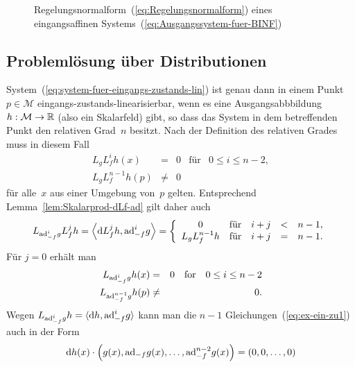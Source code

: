 \begin{figure}
\begin{centering}
\resizebox{0.9\textwidth}{!}{}
\par\end{centering}
\caption{Regelungsnormalform~(\ref{eq:Regelungsnormalform}) eines eingangsaffinen
Systems~(\ref{eq:Ausgangssystem-fuer-BINF})\label{fig:regelungsnormalform}}
\end{figure}


\subsection{Problemlösung über Distributionen\label{subsec:EZ-Linearisierung-Distributionen}}

System~(\ref{eq:system-fuer-eingangs-zustands-lin}) ist genau dann
in einem Punkt $p\in\mathcal{M}$ eingangs-zustands-linearisierbar,
wenn es eine Ausgangsabbbildung $h:\mathcal{M}\to{\mathbb{R}}$ (also ein Skalarfeld)
gibt, so dass das System in dem betreffenden Punkt den relativen Grad~$n$
besitzt. Nach der Definition des relativen Grades muss in diesem Fall
\begin{equation}
\begin{array}{rclll}
L_{g}L_{f}^{i}h(x) & = & 0 & \mbox{für} & 0\leq i\leq n-2,\\
L_{g}L_{f}^{n-1}h(p) & \neq & 0
\end{array}\label{eq:ex-ein-zu0}
\end{equation}
für alle~$x$ aus einer Umgebung von~$p$ gelten. Entsprechend Lemma~\ref{lem:Skalarprod-dLf-ad}
gilt daher auch 
\[
L_{{\operatorname{ad}}_{-f}^{i}g}L_{f}^{j}h=\left\langle {\mathrm{d}} L_{f}^{j}h,{\operatorname{ad}}_{-f}^{i}g\right\rangle =\left\{ \begin{array}{ccccc}
0 & \mbox{für} & i+j & < & n-1,\\
L_{g}L_{f}^{n-1}h & \mbox{für} & i+j & = & n-1.
\end{array}\right.
\]
Für $j=0$ erhält man 
\begin{eqnarray}
L_{{\operatorname{ad}}_{-f}^{i}g}h(x) & = & 0\quad\mbox{for}\quad0\leq i\leq n-2\label{eq:ex-ein-zu1}\\
L_{{\operatorname{ad}}_{-f}^{n-1}g}h(p) & \neq & 0.\label{eq:ex-ein-zu2}
\end{eqnarray}
Wegen $L_{{\operatorname{ad}}_{-f}^{i}g}h=\langle{\mathrm{d}} h,{\operatorname{ad}}_{-f}^{i}g\rangle$ kann
man die $n-1$ Gleichungen~(\ref{eq:ex-ein-zu1}) auch in der Form
\begin{equation}
{\mathrm{d}} h(x)\cdot\left(g(x),{\operatorname{ad}}_{-f}g(x),\ldots,{\operatorname{ad}}_{-f}^{n-2}g(x)\right)=\left(0,0,\ldots,0\right)\label{eq:ex-ein-zu-PDE}
\end{equation}
